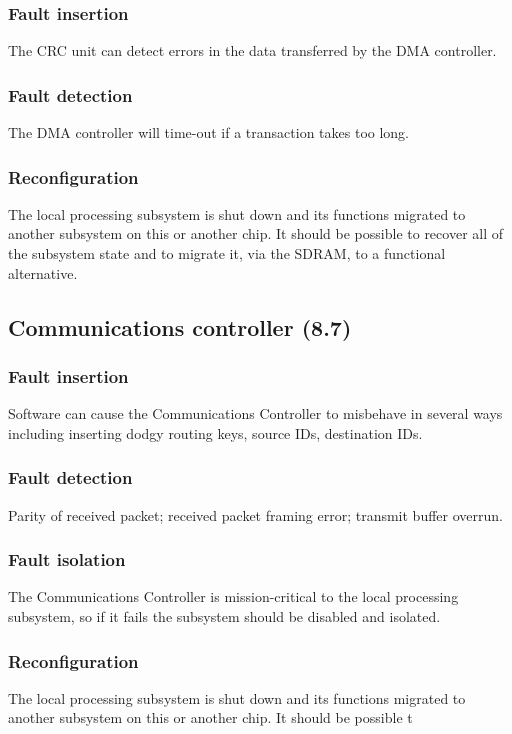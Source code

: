 \documentclass[12pt]{article}
\begin{document}
\subsubsection*{Fault insertion}
The CRC unit can detect errors in the data transferred by the DMA controller.
\subsubsection*{Fault detection}
The DMA controller will time-out if a transaction takes too long.
\subsubsection*{Reconfiguration}
The local processing subsystem is shut down and its functions migrated to another subsystem on
this or another chip. It should be possible to recover all of the subsystem state and to migrate it, via
the SDRAM, to a functional alternative.

\subsection{Communications controller (8.7)}
\subsubsection*{Fault insertion}
Software can cause the Communications Controller to misbehave in several ways including
inserting dodgy routing keys, source IDs, destination IDs.
\subsubsection*{Fault detection}
Parity of received packet; received packet framing error; transmit buffer overrun.
\subsubsection*{Fault isolation}
The Communications Controller is mission-critical to the local processing subsystem, so if it fails
the subsystem should be disabled and isolated.
\subsubsection*{Reconfiguration}
The local processing subsystem is shut down and its functions migrated to another subsystem on
this or another chip. It should be possible t
\end{document}
